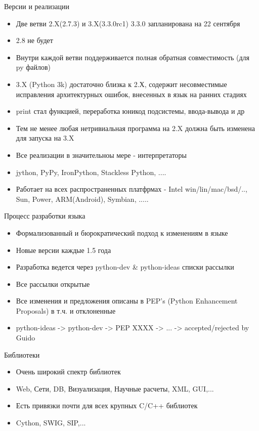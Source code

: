 \documentclass{article}
\begin{document}
\begin{center} Версии и реализации \end{center}
\begin{itemize}
    \item Две ветви 2.X(2.7.3) и 3.X(3.3.0rc1) 3.3.0 запланирована на 22 сентября
    \item 2.8 не будет
    \item Внутри каждой ветви поддерживается полная обратная совместимость (для py файлов)
    \item 3.X (Python 3k) достаточно близка к 2.Х, содержит несовместимые исправления 
    		архитектурных ошибок, внесенных в язык на ранних стадиях
    \item print стал функцией, переработка юникод подсистемы, ввода-вывода и др
    \item Тем не менее любая нетривиальная программа на 2.X должна быть изменена для запуска на 3.X
    \item Все реализации в значительноы мере - интерпретаторы
    \item jython, PyPy, IronPython, Stackless Python, ....
    \item Работает на всех распространенных платфрмах - Intel win/lin/mac/bsd/.., Sun, Power, 
    		ARM(Android), Symbian, .....
\end{itemize}
\newpage

\begin{center} Процесс разработки языка \end{center}
\begin{itemize}
    \item Формализованный и бюрократический подход к изменениям в языке
    \item Новые версии каждые 1.5 года
    \item Разработка ведется через python-dev \& python-ideas списки рассылки
    \item Все рассылки открытые
    \item Все изменения и предложения описаны в PEP's (Python Enhancement Proposals) 
            в т.ч. и отклоненные
    \item python-ideas -> python-dev -> PEP XXXX -> ... -> {accepted/rejected} by Guido
\end{itemize}
\newpage

\begin{center} Библиотеки \end{center}
\begin{itemize}
    \item Очень широкий спектр библиотек
    \item Web, Сети, DB, Визуализация, Научные расчеты, XML, GUI,...
    \item Есть привязки почти для всех крупных C/C++ библиотек
    \item Cython, SWIG, SIP,...
\end{itemize}
\newpage
\end{document}
